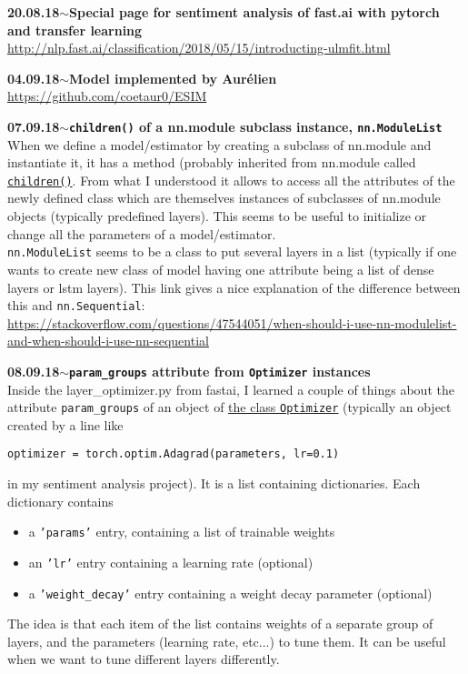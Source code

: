 \documentclass[11pt,a4paper]{article}
\newenvironment{loggentry}[2]%
{\noindent\textbf{#1}\hspace{1cm}$\mathbf{\sim}$\text{ }\textbf{#2}\\}{\vspace{0.5cm}}
\begin{document}
\begin{loggentry}{20.08.18}{Special page for sentiment analysis of fast.ai with pytorch and transfer learning}
\url{http://nlp.fast.ai/classification/2018/05/15/introducting-ulmfit.html}
\end{loggentry}

\begin{loggentry}{04.09.18}{Model implemented by Aurélien}
\url{https://github.com/coetaur0/ESIM}
\end{loggentry}

\begin{loggentry}{07.09.18}{\texttt{children()} of a nn.module subclass instance, \texttt{nn.ModuleList}}
When we define a model/estimator by creating a subclass of nn.module and instantiate it, it has a method (probably inherited from nn.module called \href{https://pytorch.org/docs/stable/nn.html#torch.nn.Module.children}{\texttt{children()}}. From what I understood it allows to access all the attributes of the newly defined class which are themselves instances of subclasses of nn.module objects (typically predefined layers). This seems to be useful to initialize or change all the parameters of a model/estimator.\\

\texttt{nn.ModuleList} seems to be a class to put several layers in a list (typically if one wants to create new class of model having one attribute being a list of dense layers or lstm layers). This link gives a nice explanation of the difference between this and \texttt{nn.Sequential}:\\
\url{https://stackoverflow.com/questions/47544051/when-should-i-use-nn-modulelist-and-when-should-i-use-nn-sequential}\\
\end{loggentry}

\begin{loggentry}{08.09.18}{\texttt{param\_groups} attribute from \texttt{Optimizer} instances}
Inside the layer\_optimizer.py from fastai, I learned a couple of things about the attribute \texttt{param\_groups} of an object of \href{https://pytorch.org/docs/0.3.1/_modules/torch/optim/optimizer.html#Optimizer}{the class \texttt{Optimizer}} (typically an object created by a line like
\begin{verbatim}
optimizer = torch.optim.Adagrad(parameters, lr=0.1)
\end{verbatim}
in my sentiment analysis project). It is a list containing dictionaries. Each dictionary contains
\begin{itemize}
\item a \texttt{'params'} entry, containing a list of trainable weights
\item an \texttt{'lr'} entry containing a learning rate (optional)
\item a \texttt{'weight\_decay'} entry containing a weight decay parameter (optional)
\end{itemize}
The idea is that each item of the list contains weights of a separate group of layers, and the parameters (learning rate, etc...) to tune them. It can be useful when we want to tune different layers differently.
\end{loggentry}
\end{document}
